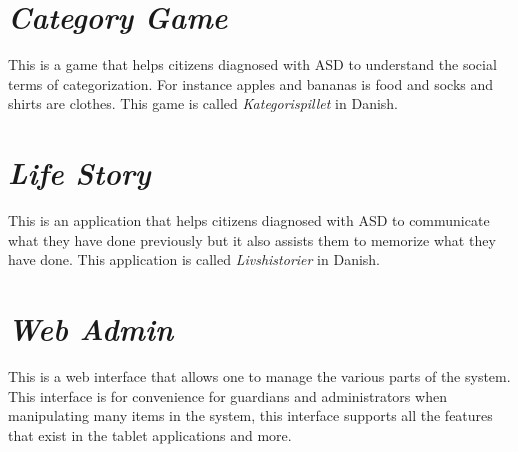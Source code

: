 \section{\emph{Category Game}}
\label{sec:app_category_game}
This is a game that helps citizens diagnosed with ASD to understand the social terms of categorization. For instance apples and bananas is food and socks and shirts are clothes. This game is called \emph{Kategorispillet} in Danish.

\section{\emph{Life Story}}
\label{sec:app_life_story}
This is an application that helps citizens diagnosed with ASD to communicate what they have done previously but it also assists them to memorize what they have done. This application is called \emph{Livshistorier} in Danish.

\section{\emph{Web Admin}}
\label{sec:app_web_admin}
This is a web interface that allows one to manage the various parts of the \giraf system. This interface is for convenience for guardians and administrators when manipulating many items in the system, this interface supports all the features that exist in the tablet applications and more.